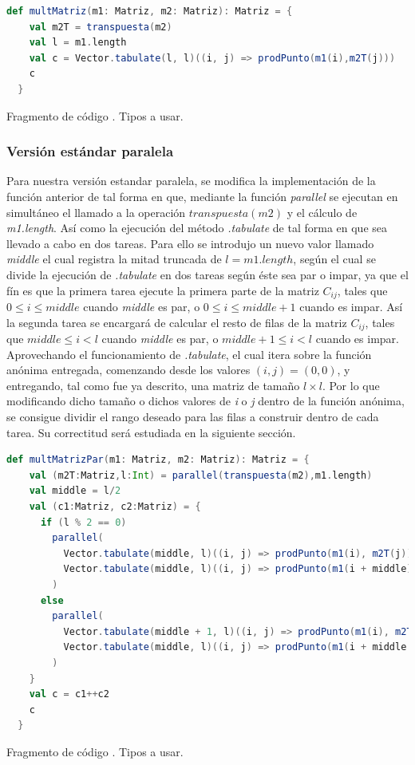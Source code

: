 \documentclass{article}
\newcounter{codesnippet}
\newcommand{\newcodesnippet}{%
  \stepcounter{codesnippet}%
}
\begin{document}
\newcodesnippet
\begin{lstlisting}[language=Scala]
  def multMatriz(m1: Matriz, m2: Matriz): Matriz = {
    val m2T = transpuesta(m2)
    val l = m1.length
    val c = Vector.tabulate(l, l)((i, j) => prodPunto(m1(i),m2T(j)))
    c
  }
\end{lstlisting}
\begin{center}
    \small{Fragmento de código \thecodesnippet. Tipos a usar.}
\end{center}
\subsubsection{Versión estándar paralela}

Para nuestra versión estandar paralela, se modifica la implementación de la función anterior de tal forma en que, mediante la función \textit{parallel} se ejecutan en simultáneo el llamado a la operación \(transpuesta(m2)\) y el cálculo de \textit{m1.length}. Así como la ejecución del método \textit{.tabulate} de tal forma en que sea llevado a cabo en dos tareas. Para ello se introdujo un nuevo valor llamado \textit{middle} el cual registra la mitad truncada de \(l = m1.length\), según el cual se divide la ejecución de \textit{.tabulate} en dos tareas según éste sea par o impar, ya que el fín es que la primera tarea ejecute la primera parte de la matriz \(C_{ij}\), tales que \(0 \leq i \leq middle\) cuando \textit{middle} es par, o \(0 \leq i \leq middle + 1\) cuando es impar. Así la segunda tarea se encargará de calcular el resto de filas de la matriz \(C_{ij}\), tales que \(middle \leq i < l\) cuando \textit{middle} es par, o \(middle + 1 \leq i < l\) cuando es impar. Aprovechando el funcionamiento de \textit{.tabulate}, el cual itera sobre la función anónima entregada, comenzando desde los valores \((i,j) = (0,0)\), y entregando, tal como fue ya descrito, una matriz de tamaño \(l \times l\). Por lo que modificando dicho tamaño o dichos valores de \textit{i} o \textit{j} dentro de la función anónima, se consigue dividir el rango deseado para las filas a construir dentro de cada tarea. Su correctitud será estudiada en la siguiente sección.\\

\newcodesnippet
\begin{lstlisting}[language=Scala]
  def multMatrizPar(m1: Matriz, m2: Matriz): Matriz = {
    val (m2T:Matriz,l:Int) = parallel(transpuesta(m2),m1.length)
    val middle = l/2
    val (c1:Matriz, c2:Matriz) = {
      if (l % 2 == 0)
        parallel(
          Vector.tabulate(middle, l)((i, j) => prodPunto(m1(i), m2T(j))),
          Vector.tabulate(middle, l)((i, j) => prodPunto(m1(i + middle), m2T(j)))
        )
      else
        parallel(
          Vector.tabulate(middle + 1, l)((i, j) => prodPunto(m1(i), m2T(j))),
          Vector.tabulate(middle, l)((i, j) => prodPunto(m1(i + middle + 1), m2T(j)))
        )
    }
    val c = c1++c2
    c
  }
\end{lstlisting}
\begin{center}
    \small{Fragmento de código \thecodesnippet. Tipos a usar.}
\end{center}
\end{document}

